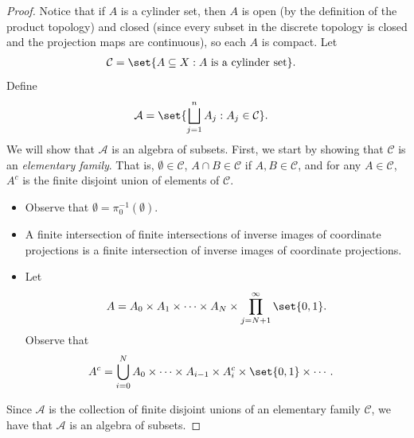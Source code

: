 \documentclass[10pt]{mypackage}
\begin{document}
\begin{proof}
  Notice that if $A$ is a cylinder set, then $A$ is open (by the definition of the product topology) and closed (since every subset in the discrete topology is closed and the projection maps are continuous), so each $A$ is compact. Let
  \begin{align*}
    \mathcal{C} &= \set{A\subseteq X: A\text{ is a cylinder set}}.
  \end{align*}
  Define 
  \begin{align*}
    \mathcal{A} &= \set{\bigsqcup_{j=1}^{n}A_j : A_j\in \mathcal{C}}.
  \end{align*}
  We will show that $\mathcal{A}$ is an algebra of subsets. First, we start by showing that $\mathcal{C}$ is an \textit{elementary family}. That is, $\emptyset\in \mathcal{C}$, $A\cap B\in \mathcal{C}$ if $A,B\in \mathcal{C}$, and for any $A\in \mathcal{C}$, $A^{c}$ is the finite disjoint union of elements of $\mathcal{C}$.
  \begin{itemize}
    \item Observe that $\emptyset = \pi_0^{-1}\left( \emptyset \right)$.
    \item A finite intersection of finite intersections of inverse images of coordinate projections is a finite intersection of inverse images of coordinate projections.
    \item Let 
      \begin{align*}
        A = A_0\times A_1\times\cdots\times A_N\times\prod_{j=N+1}^{\infty} \set{0,1}.
      \end{align*}
      Observe that
      \begin{align*}
        A^{c} &= \bigcup_{i=0}^{N} A_0\times\cdots\times A_{i-1}\times A_i^{c}\times\set{0,1}\times\cdots.
      \end{align*}
  \end{itemize}
  Since $\mathcal{A}$ is the collection of finite disjoint unions of an elementary family $ \mathcal{C} $, we have that $\mathcal{A}$ is an algebra of subsets.


\end{proof}
\end{document}
